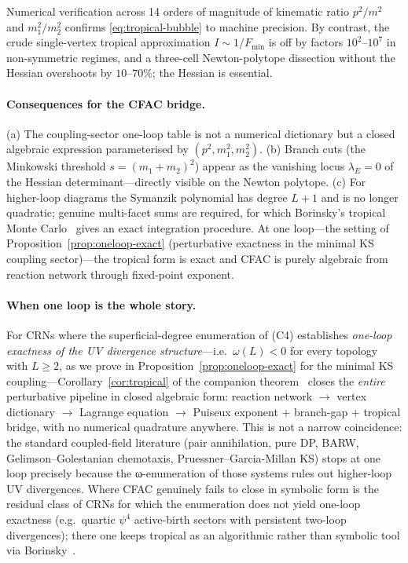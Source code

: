 \documentclass[11pt,a4paper]{article}
\theoremstyle{plain}
\begin{document}
Numerical verification across 14 orders of magnitude of
kinematic ratio $p^2/m^2$ and $m_1^2/m_2^2$ confirms
\eqref{eq:tropical-bubble} to machine precision.  By contrast,
the crude single-vertex tropical approximation $I \sim 1/F_{\min}$
is off by factors $10^2$--$10^7$ in non-symmetric regimes, and a
three-cell Newton-polytope dissection without the Hessian
overshoots by $10$--$70\%$; the Hessian is essential.

\paragraph{Consequences for the CFAC bridge.}
(a) The coupling-sector one-loop table is not a numerical
dictionary but a closed algebraic expression parameterised by
$(p^2, m_1^2, m_2^2)$.
(b) Branch cuts (the Minkowski threshold $s = (m_1+m_2)^2$)
appear as the vanishing locus $\lambda_E = 0$ of the Hessian
determinant---directly visible on the Newton polytope.
(c) For higher-loop diagrams the Symanzik polynomial has degree
$L+1$ and is no longer quadratic; genuine multi-facet sums are
required, for which Borinsky's tropical Monte
Carlo~\cite{Borinsky2020,Borinsky2025} gives an exact integration
procedure.  At one loop---the setting of
Proposition~\ref{prop:oneloop-exact} (perturbative exactness in
the minimal KS coupling sector)---the tropical form is exact and
CFAC is purely algebraic from reaction network through fixed-point
exponent.

\paragraph{When one loop is the whole story.}
For CRNs where the superficial-degree enumeration of (C4)
establishes \emph{one-loop exactness of the UV divergence
structure}---i.e.\ $\omega(L) < 0$ for every topology with
$L \geq 2$, as we prove in Proposition~\ref{prop:oneloop-exact}
for the minimal KS coupling---Corollary~\ref{cor:tropical} of the
companion theorem~\citep{CFACtheorem} closes the \emph{entire}
perturbative pipeline in closed algebraic form: reaction network
$\to$ vertex dictionary $\to$ Lagrange equation $\to$ Puiseux
exponent + branch-gap + tropical bridge, with no numerical
quadrature anywhere.  This is not a narrow coincidence: the
standard coupled-field literature (pair annihilation, pure DP,
BARW, Gelimson--Golestanian chemotaxis, Pruessner--Garcia-Millan
KS) stops at one loop precisely because the ω-enumeration of
those systems rules out higher-loop UV divergences.  Where CFAC
genuinely fails to close in symbolic form is the residual class
of CRNs for which the enumeration does not yield one-loop
exactness (e.g.\ quartic $\psi^4$ active-birth sectors with
persistent two-loop divergences); there one keeps tropical as an
algorithmic rather than symbolic tool via
Borinsky~\cite{Borinsky2020,Borinsky2025}.
\end{document}
